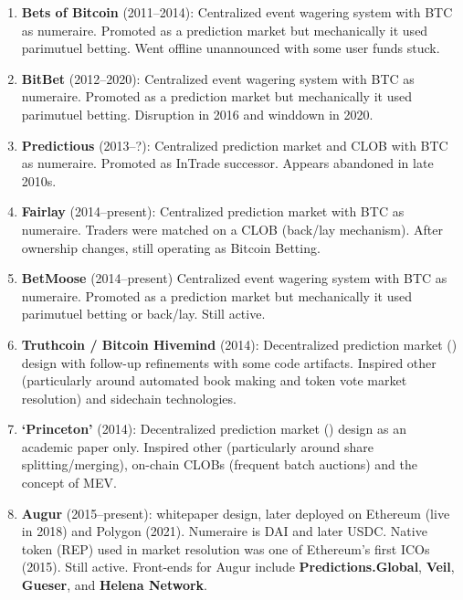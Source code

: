 \begin{enumerate}

\item \textbf{Bets of Bitcoin} (2011--2014): Centralized event wagering system with BTC as numeraire. Promoted as a prediction market but mechanically it used parimutuel betting. Went offline unannounced with some user funds stuck.

\item \textbf{BitBet} (2012--2020): Centralized event wagering system with BTC as numeraire. Promoted as a prediction market but mechanically it used parimutuel betting. Disruption in 2016 and winddown in 2020. 

\item \textbf{Predictious} (2013--?): Centralized prediction market and CLOB with BTC as numeraire. Promoted as InTrade successor. Appears abandoned in late 2010s.

\item \textbf{Fairlay} (2014--present): Centralized prediction market with BTC as numeraire. Traders were matched on a CLOB (back/lay mechanism). After ownership changes, still operating as Bitcoin Betting. 

\item \textbf{BetMoose} (2014--present) Centralized event wagering system with BTC as numeraire. Promoted as a prediction market but mechanically it used parimutuel betting or back/lay. Still active. 

\item \textbf{Truthcoin / Bitcoin Hivemind} (2014): Decentralized prediction market (\depm) design with follow-up refinements with some code artifacts. Inspired other \depms (particularly around automated book making and token vote market resolution) and sidechain technologies.

\item \textbf{`Princeton' \depm} (2014): Decentralized prediction market (\depm) design as an academic paper only. Inspired other \depms (particularly around share splitting/merging), on-chain CLOBs (frequent batch auctions) and the concept of MEV.  

\item \textbf{Augur} (2015--present): \depm whitepaper design, later deployed on Ethereum (live in 2018) and Polygon (2021). Numeraire is DAI and later USDC. Native token (REP) used in market resolution was one of Ethereum's first ICOs (2015). Still active. Front-ends for Augur include \textbf{Predictions.Global}, \textbf{Veil}, \textbf{Gueser}, and \textbf{Helena Network}.


\end{enumerate}
